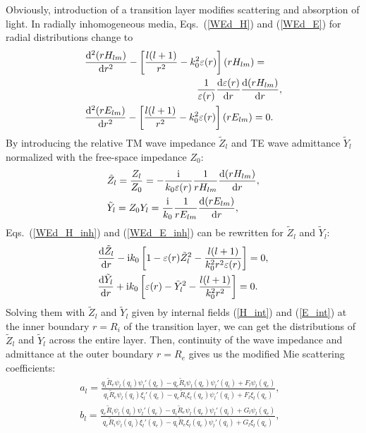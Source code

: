 \documentclass[aps,prb,reprint]{revtex4-2}
\renewcommand{\d}{{\rm d}}
\renewcommand{\i}{{\rm i}}
\begin{document}
Obviously, introduction of a transition layer modifies scattering and absorption of light. In radially inhomogeneous media, Eqs.~(\ref{WEd_H}) and (\ref{WEd_E}) for radial distributions change to 
\begin{eqnarray}
	&\displaystyle 
	\frac{\d^2 (rH_{lm})}{\d r^2}-\left[\frac{l(l+1)}{r^2}-k_0^2\varepsilon(r)\right](rH_{lm})=\nonumber \\
	&\displaystyle 
	\hspace{4cm}\frac{1}{\varepsilon(r)}\frac{\d \varepsilon(r)}{\d r}\frac{\d(r  H_{lm})}{\d r},\label{WEd_H_inh}\\
	&\displaystyle
		\frac{\d^2 (rE_{lm})}{\d r^2}-\left[\frac{l(l+1)}{r^2}-k_0^2\varepsilon(r)\right](rE_{lm})=0. \label{WEd_E_inh}
\end{eqnarray}
By introducing the relative TM wave impedance $\tilde Z_l$ and TE wave admittance $\tilde Y_l$ normalized with the free-space impedance $Z_0$:  
\begin{eqnarray}
	&\displaystyle 
	\tilde Z_l=\frac{Z_l}{Z_0}=- \frac{\i}{k_0\varepsilon(r)}\frac{1}{r H_{lm}}\frac{\d (r H_{lm})}{\d r},\\
	&\displaystyle
	\tilde Y_l=Z_0Y_l=\frac{\i}{k_0}\frac{1}{r E_{lm}}\frac{\d (r E_{lm})}{\d r},
\end{eqnarray}
Eqs.~(\ref{WEd_H_inh}) and (\ref{WEd_E_inh}) can be rewritten for $\tilde Z_l$ and $\tilde Y_l$:
\begin{eqnarray}
	&\displaystyle 
	\frac{\d \tilde Z_l}{\d r}-\i k_0\left[1-\varepsilon(r)\tilde Z_l^2-\frac{l(l+1)}{k_0^2r^2\varepsilon(r)}\right]=0,
\label{Z_H}\\
	&\displaystyle 
	\frac{\d \tilde Y_l}{\d r}+\i k_0\left[\varepsilon(r)-\tilde Y_l^2-\frac{l(l+1)}{k_0^2r^2}\right]=0.
\label{Y_E}
\end{eqnarray}
Solving them with $\tilde Z_l$ and $\tilde Y_l$ given by internal fields (\ref{H_int}) and (\ref{E_int}) at the inner boundary $r=R_i$ of the transition layer, we can get the distributions of $\tilde Z_l$ and $\tilde Y_l$ across the entire layer. Then, continuity of the wave impedance and admittance at the outer boundary $r=R_e$ gives us the modified Mie scattering coefficients: 
\begin{eqnarray}
	\displaystyle 
	a_{l}=\frac{q_i\tilde R_e\psi_l(q_i)\psi_l'(q_e)-q_e\tilde R_i\psi_l(q_e)\psi_l'(q_i)+F_l\psi_l(q_e)}
	{q_i\tilde R_e\psi_l(q_i)\xi_l'(q_e)-q_e \tilde R_i\xi_l(q_e)\psi_l'(q_i)+F_l\xi_l(q_e)},~~~
\label{a_l_tra}\\
	\displaystyle 
	b_{l}=\frac{q_e\tilde R_i\psi_l(q_i)\psi_l'(q_e)-q_i\tilde R_e\psi_l(q_e)\psi_l'(q_i)+G_l\psi_l(q_e)}
	{q_e\tilde R_i\psi_l(q_i)\xi_l'(q_e)-q_i\tilde R_e\xi_l(q_e)\psi_l'(q_i)+G_l\xi_l(q_e)},~~~
\label{b_l_tra}
\end{eqnarray}
\end{document}
